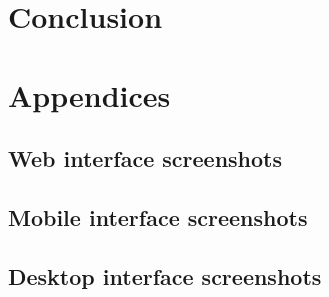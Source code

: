 \documentclass[a4paper,12pt, twocolumn]{article}
\begin{document}

\section*{Conclusion}




\section*{Appendices}

\appendix
\renewcommand{\thesubsection}{\thesection \Alph{subsection}}


\subsection{Web interface screenshots}


\subsection{Mobile interface screenshots}


\subsection{Desktop interface screenshots}
\end{document}
